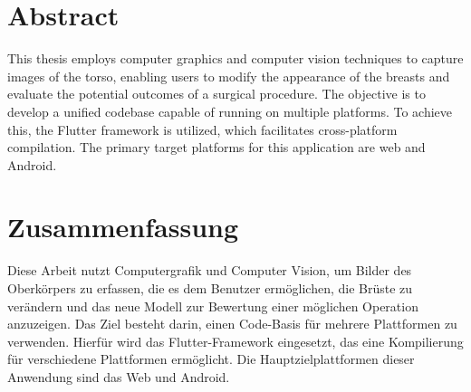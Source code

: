 \chapter*{Abstract}

This thesis employs computer graphics and computer vision techniques to capture images of the torso, enabling users to modify the appearance of the breasts and evaluate the potential outcomes of a surgical procedure. The objective is to develop a unified codebase capable of running on multiple platforms. To achieve this, the Flutter framework is utilized, which facilitates cross-platform compilation. The primary target platforms for this application are web and Android.

\cleardoublepage
\chapter*{Zusammenfassung}

Diese Arbeit nutzt Computergrafik und Computer Vision, um Bilder des Oberkörpers zu erfassen, die es dem Benutzer ermöglichen, die Brüste zu verändern und das neue Modell zur Bewertung einer möglichen Operation anzuzeigen. Das Ziel besteht darin, einen Code-Basis für mehrere Plattformen zu verwenden. Hierfür wird das Flutter-Framework eingesetzt, das eine Kompilierung für verschiedene Plattformen ermöglicht. Die Hauptzielplattformen dieser Anwendung sind das Web und Android.
